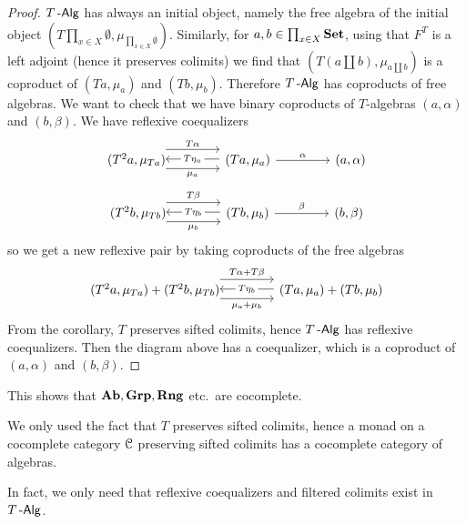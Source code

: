 \documentclass[a4paper,11pt,oneside,openany]{scrbook}
\begin{document}
\begin{proof}
$T\operatorname{-\mathsf{Alg}}$ has always an initial object, namely the free algebra of the initial
    object $\left(T\prod_{x\in X}\emptyset,\mu_{\prod_{x\in
    X}\emptyset}\right)$. Similarly, for $a,b\in\prod_{x\in X}{\normalfont\textbf{Set}}$, using that
    $F^T$ is a left adjoint (hence it preserves colimits) we find that
    $\left(T\left(a\coprod b\right),\mu_{a\coprod b}\right)$ is a coproduct of
    $(Ta,\mu_a)$ and $(Tb,\mu_b)$. Therefore $T\operatorname{-\mathsf{Alg}}$ has coproducts of free
    algebras. We want to check that we have binary coproducts of $T$-algebras
    $(a,\alpha)$ and $(b,\beta)$. We have reflexive coequalizers
\[
\begin{tikzcd}[column sep=1.5cm]
(T^2a,\mu_{Ta})\hspace{-1.5mm}\arrow[r, shift right=1.5ex, "\mu_a"']  \arrow[r, shift left=2ex, "T\alpha"] & (Ta,\mu_a)\arrow[l, shift right=.25ex, "T\eta_a"description]\arrow[r,"\alpha"]&(a,\alpha)
\end{tikzcd}
\]
\[
\begin{tikzcd}[column sep=1.5cm]
(T^2b,\mu_{Tb})\hspace{-1.5mm}\arrow[r, shift right=1.5ex, "\mu_b"']  \arrow[r, shift left=2ex, "T\beta"] & (Tb,\mu_b)\arrow[l, shift right=.25ex, "T\eta_b"description]\arrow[r,"\beta"]&(b,\beta)
\end{tikzcd}
\]
so we get a new reflexive pair by taking coproducts of the free algebras
\[
\begin{tikzcd}[column sep=1.5cm]
(T^2a,\mu_{Ta})+(T^2b,\mu_{Tb})\hspace{-1.5mm}\arrow[r, shift right=1.5ex, "\mu_a+\mu_b"']  \arrow[r, shift left=2ex, "T\alpha+T\beta"] & (Ta,\mu_a)+(Tb,\mu_b)\arrow[l, shift right=.25ex, "T\eta_b"description]
\end{tikzcd}
\]
From the corollary, $T$ preserves sifted colimits, hence $T\operatorname{-\mathsf{Alg}}$ has reflexive coequalizers. Then the diagram above has a coequalizer, which is a coproduct of $(a,\alpha)$ and $(b,\beta)$. 
\end{proof}
\begin{rmk}
	This shows that ${\normalfont\textbf{Ab}},\mathbf{Grp},\mathbf{Rng}$ etc.\ are cocomplete.
\end{rmk}
\begin{rmk}
	We only used the fact that $T$ preserves sifted colimits, hence a monad on a cocomplete category $\operatorname{\mathcal{C}}$ preserving sifted colimits has a cocomplete category of algebras.
\end{rmk}
\begin{rmk}
	In fact, we only need that reflexive coequalizers and filtered colimits exist in $T\operatorname{-\mathsf{Alg}}$.
\end{rmk}
\end{document}
